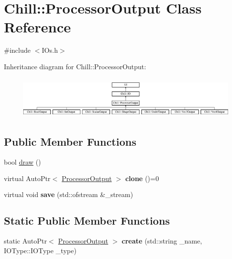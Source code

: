 \hypertarget{class_chill_1_1_processor_output}{}\section{Chill\+:\+:Processor\+Output Class Reference}
\label{class_chill_1_1_processor_output}


{\ttfamily \#include $<$I\+Os.\+h$>$}

Inheritance diagram for Chill\+:\+:Processor\+Output\+:\begin{figure}[H]
\begin{center}
\leavevmode
\includegraphics[height=2.191781cm]{class_chill_1_1_processor_output}
\end{center}
\end{figure}
\subsection*{Public Member Functions}
\begin{DoxyCompactItemize}
\item 
bool \mbox{\hyperlink{class_chill_1_1_processor_output_ae9d397902ac6fcd1fa09fff1cc9231c0}{draw}} ()
\item 
\mbox{\label{class_chill_1_1_processor_output_abd2987def60f35a31eda5093f773a595}} 
virtual Auto\+Ptr$<$ \mbox{\hyperlink{class_chill_1_1_processor_output}{Processor\+Output}} $>$ {\bfseries clone} ()=0
\item 
\mbox{\label{class_chill_1_1_processor_output_ad20a1c3db1b58a6e6b00df9c3ff44d47}} 
virtual void {\bfseries save} (std\+::ofstream \&\+\_\+stream)
\end{DoxyCompactItemize}
\subsection*{Static Public Member Functions}
\begin{DoxyCompactItemize}
\item 
\mbox{\label{class_chill_1_1_processor_output_a41a3be6bf91145f934cdd905cc0e44c0}} 
static Auto\+Ptr$<$ \mbox{\hyperlink{class_chill_1_1_processor_output}{Processor\+Output}} $>$ {\bfseries create} (std\+::string \+\_\+name, I\+O\+Type\+::\+I\+O\+Type \+\_\+type)
\end{DoxyCompactItemize}

